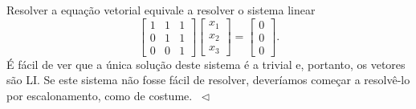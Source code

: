 \begin{ex}
Resolver a equação vetorial equivale a resolver o sistema linear
\begin{equation}
\left[
  \begin{array}{ccc}
    1 & 1 & 1 \\
    0 & 1 & 1 \\
    0 & 0 & 1
  \end{array}
\right]
\left[
  \begin{array}{c}
    x_1 \\
    x_2 \\
    x_3
  \end{array}
\right] =
\left[
  \begin{array}{c}
    0 \\
    0 \\
    0
  \end{array}
\right].
\end{equation} É fácil de ver que a única solução deste sistema é a trivial e, portanto, os vetores são LI. Se este sistema não fosse fácil de resolver, deveríamos começar a resolvê-lo por escalonamento, como de costume. $\ \lhd$
\end{ex}

